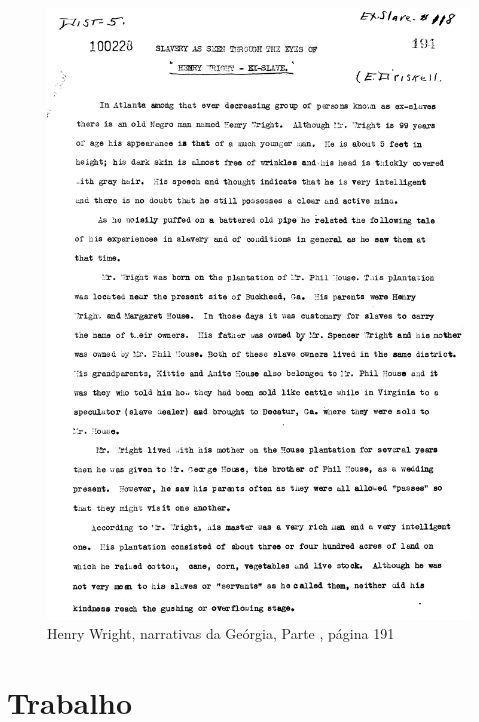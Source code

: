 \begin{absolutelynopagebreak}
\begin{vplace}
\begin{figure}[H]
\begin{adjustwidth}{-1.8cm}{}
  \vspace*{-2cm}
  \includegraphics[width=130mm]{./imgs/Cap1.jpg}  
\end{adjustwidth}
  \caption{Henry Wright, narrativas da Geórgia, Parte , página 191}
\end{figure}
\end{vplace}

\end{absolutelynopagebreak}

\chapter{Trabalho}

